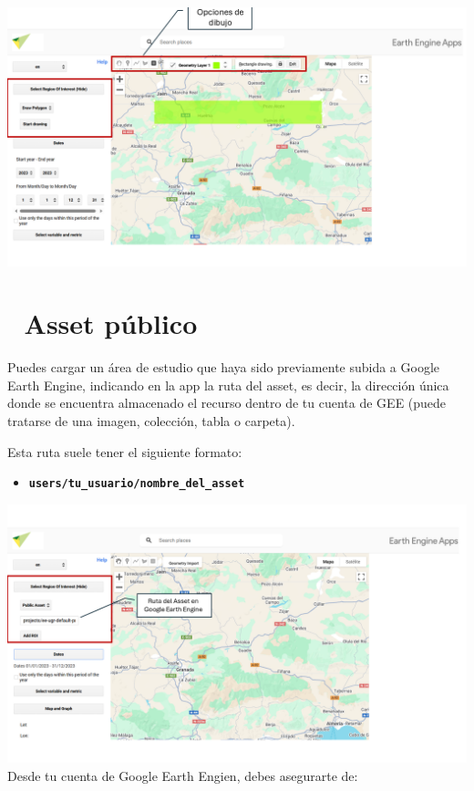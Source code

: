 \documentclass[
]{book}
\providecommand{\tightlist}{%
  \setlength{\itemsep}{0pt}\setlength{\parskip}{0pt}}
\begin{document}
\includegraphics{assets/dibujado.png}

\section{\texorpdfstring{\textbf{📂 Asset público}}{📂 Asset público}}\label{asset-puxfablico}

Puedes cargar un área de estudio que haya sido previamente subida a Google Earth Engine, indicando en la app la ruta del asset, es decir, la dirección única donde se encuentra almacenado el recurso dentro de tu cuenta de GEE (puede tratarse de una imagen, colección, tabla o carpeta).

Esta ruta suele tener el siguiente formato:

\begin{itemize}
\tightlist
\item
  \textbf{\texttt{users/tu\_usuario/nombre\_del\_asset}}
\end{itemize}

\includegraphics{assets/asset_es.png}
Desde tu cuenta de Google Earth Engien, debes asegurarte de:
\end{document}
